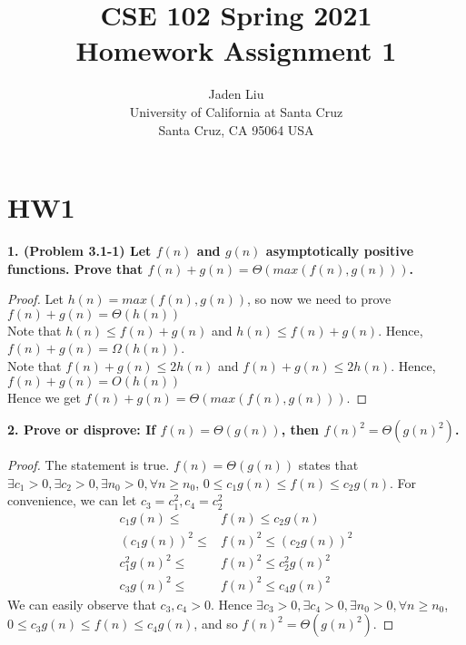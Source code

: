 \documentclass[12pt]{article}
\begin{document}
\title{ CSE 102 Spring 2021\\
	Homework Assignment 1}

\author{Jaden Liu \\ 
University of California at Santa Cruz\\
Santa Cruz, CA 95064 USA }

\maketitle


\section{HW1} 

\textbf{1. (Problem 3.1-1) Let $f(n)$ and $g(n)$ asymptotically positive functions. Prove that $f(n) + g(n) =
	\Theta(max(f(n), g(n)))$.}\\

\begin{proof}
	Let $h(n)=max(f(n),g(n))$, so now we need to prove $f(n) + g(n) =\Theta(h(n))$\\
	Note that $h(n)\le f(n)+g(n)$ and $h(n)\le f(n)+g(n)$. Hence, $f(n) + g(n) =\Omega(h(n))$.\\
	Note that $f(n)+g(n) \le 2h(n)$ and $f(n)+g(n)\le 2h(n)$. Hence, $f(n) + g(n) =O(h(n))$\\
	Hence we get $f(n) + g(n) =\Theta(max(f(n), g(n)))$.
\end{proof}
\noindent \textbf{2. Prove or disprove: If $f(n)=\Theta(g(n))$, then $f(n)^2 = \Theta(g(n)^2)$.}\\

\begin{proof}
	The statement is true. $f(n)=\Theta(g(n))$ states that $\exists c_1>0, \exists c_2>0, \exists n_0>0, \forall n\ge n_0$, $0\le c_1g(n)\le f(n)\le c_2g(n)$. For convenience, we can let $c_3=c_1^2, c_4=c_2^2$\\
	\begin{align*}
		c_1g(n)\le &f(n) \le c_2g(n)\\
		(c_1g(n))^2\le &f(n)^2 \le (c_2g(n))^2\\
		c_1^2g(n)^2\le &f(n)^2 \le c_2^2g(n)^2\\
		c_3g(n)^2\le &f(n)^2 \le c_4g(n)^2
	\end{align*}
We can easily observe that $c_3,c_4>0$. Hence $\exists c_3>0, \exists c_4>0, \exists n_0>0, \forall n\ge n_0$, $0\le c_3g(n)\le f(n)\le c_4g(n)$, and so $f(n)^2=\Theta(g(n)^2)$.
\end{proof}
\end{document}
